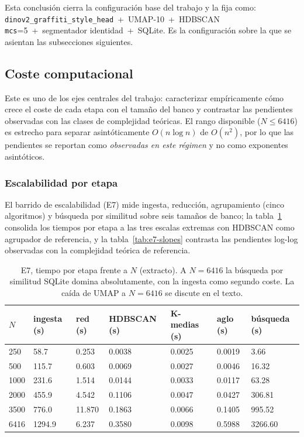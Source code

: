 Esta conclusión cierra la configuración base del trabajo y la fija como:
\texttt{dinov2\_graffiti\_style\_head}~+~UMAP-10~+~HDBSCAN
\texttt{mcs}=5~+~segmentador identidad~+~SQLite. Es la configuración sobre la
que se asientan las subsecciones siguientes.

\subsection{Coste computacional}
\label{subsec:res-coste}
Este es uno de los ejes centrales del trabajo: caracterizar empíricamente cómo
crece el coste de cada etapa con el tamaño del banco y contrastar las
pendientes observadas con las clases de complejidad teóricas. El rango
disponible ($N\le 6416$) es estrecho para separar asintóticamente $O(n\log n)$
de $O(n^2)$, por lo que las pendientes se reportan como \emph{observadas en
este régimen} y no como exponentes asintóticos.

\subsubsection{Escalabilidad por etapa}
\label{subsubsec:res-escalabilidad}
El barrido de escalabilidad (E7) mide ingesta, reducción, agrupamiento (cinco
algoritmos) y búsqueda por similitud sobre seis tamaños de banco; la
tabla~\ref{tab:e7-cost} consolida los tiempos por etapa a las tres escalas
extremas con HDBSCAN como agrupador de referencia, y la
tabla~\ref{tab:e7-slopes} contrasta las pendientes log-log observadas con la
complejidad teórica de referencia.

\begin{table}[h]
  \centering
{\footnotesize
\begin{tabular}{|p{1.0cm}|p{1.6cm}|p{1.2cm}|p{2.0cm}|p{2.0cm}|p{1.4cm}|p{2.0cm}|} \hline
  \textbf{$N$} & \textbf{ingesta (s)} & \textbf{red (s)} & \textbf{HDBSCAN (s)} & \textbf{K-medias (s)} & \textbf{aglo (s)} & \textbf{búsqueda (s)} \\ \hline
   250 &   58.7 &  0.253 & 0.0038 & 0.0025 & 0.0019 &   3.66 \\ \hline
   500 &  115.7 &  0.603 & 0.0069 & 0.0027 & 0.0046 &  16.32 \\ \hline
  1000 &  231.6 &  1.514 & 0.0144 & 0.0033 & 0.0117 &  63.28 \\ \hline
  2000 &  455.9 &  4.542 & 0.1106 & 0.0047 & 0.0427 & 306.81 \\ \hline
  3500 &  776.0 & 11.870 & 0.1863 & 0.0066 & 0.1405 & 995.52 \\ \hline
  6416 & 1294.9 &  6.237 & 0.3580 & 0.0098 & 0.5988 & 3266.60 \\ \hline
\end{tabular}
}
  \caption[E7, tiempo por etapa frente a $N$]{E7, tiempo por etapa frente a $N$ (extracto). A $N=6416$ la búsqueda
  por similitud SQLite domina absolutamente, con la ingesta como segundo coste.
La caída de UMAP a $N=6416$ se discute en el texto.}
  \label{tab:e7-cost}
\end{table}

